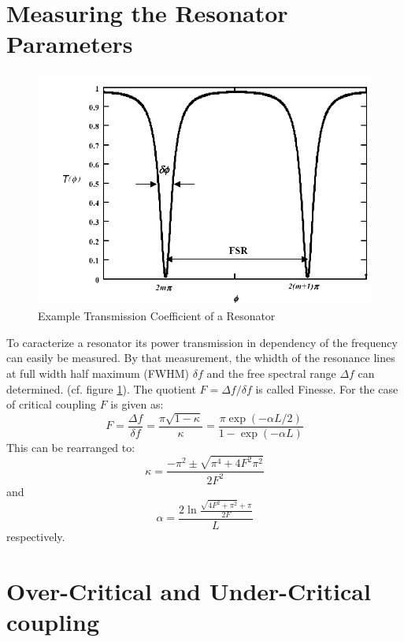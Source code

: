 \section{Measuring the Resonator Parameters}

\begin{figure}[h]%
\centering
\includegraphics[width=.5\columnwidth]{Grafiken/S21.pdf}%
\caption{Example Transmission Coefficient of a Resonator}%
\label{fig:S21}%
\end{figure}

To caracterize a resonator its power transmission in dependency of the frequency can easily be measured. By that measurement, the whidth of the resonance lines at full width half maximum (FWHM) $\delta f$ and the free spectral range $\Delta f$ can determined. (cf. figure \ref{fig:S21}). The quotient $F= \Delta f/\delta f$ is called Finesse. For the case of critical coupling $F$ is given as:
\begin{equation}
 F = \frac{\Delta f}{\delta f} = \frac{\pi\sqrt{1-\kappa}}{\kappa}=\frac{\pi\exp\left(-\alpha L/2\right)}{1-\exp\left(-\alpha L\right)}
\end{equation}
This can be rearranged to:
\begin{equation}
 \kappa = \frac{-\pi^2 \pm \sqrt{\pi^4+4F^2\pi^2}}{2F^2}
\end{equation}
and
\begin{equation}
\alpha = \frac{2\ln\frac{\sqrt{4F^2+\pi^2}+\pi}{2F}}{L} 
\end{equation}
respectively.

\section{Over-Critical and Under-Critical coupling}
